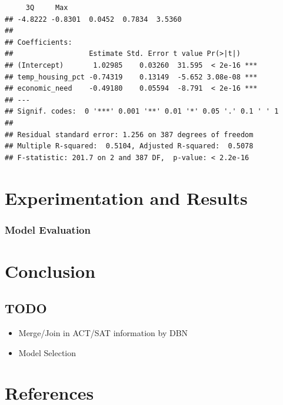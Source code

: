 \documentclass[
  man]{apa6}
\providecommand{\tightlist}{%
  \setlength{\itemsep}{0pt}\setlength{\parskip}{0pt}}
\begin{document}
\begin{verbatim}
     3Q     Max 
## -4.8222 -0.8301  0.0452  0.7834  3.5360 
## 
## Coefficients:
##                  Estimate Std. Error t value Pr(>|t|)    
## (Intercept)       1.02985    0.03260  31.595  < 2e-16 ***
## temp_housing_pct -0.74319    0.13149  -5.652 3.08e-08 ***
## economic_need    -0.49180    0.05594  -8.791  < 2e-16 ***
## ---
## Signif. codes:  0 '***' 0.001 '**' 0.01 '*' 0.05 '.' 0.1 ' ' 1
## 
## Residual standard error: 1.256 on 387 degrees of freedom
## Multiple R-squared:  0.5104, Adjusted R-squared:  0.5078 
## F-statistic: 201.7 on 2 and 387 DF,  p-value: < 2.2e-16
\end{verbatim}

\hypertarget{experimentation-and-results}{%
\section{Experimentation and Results}\label{experimentation-and-results}}

\hypertarget{model-evaluation}{%
\subsubsection{Model Evaluation}\label{model-evaluation}}

\hypertarget{conclusion}{%
\section{Conclusion}\label{conclusion}}

\hypertarget{todo}{%
\subsection{TODO}\label{todo}}

\begin{itemize}
\tightlist
\item
  Merge/Join in ACT/SAT information by DBN
\item
  Model Selection
\end{itemize}

\newpage

\hypertarget{references}{%
\section{References}\label{references}}
\end{document}
